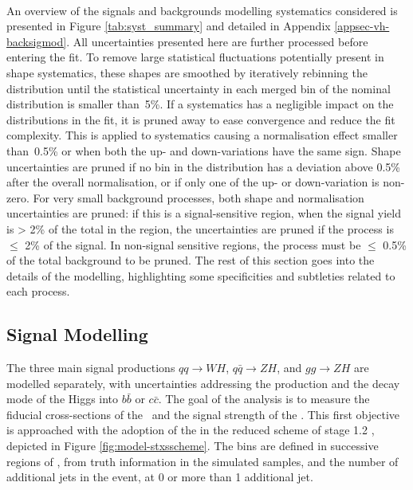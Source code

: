 \paragraph{}An overview of the signals and backgrounds modelling systematics considered is presented in Figure \ref{tab:syst_summary} and detailed in Appendix \ref{appsec-vh-backsigmod}. All uncertainties presented here are further processed before entering the fit. To remove large statistical fluctuations potentially present in shape systematics, these shapes are smoothed by iteratively rebinning the distribution until the statistical uncertainty in each merged bin of the nominal distribution is smaller than~5\%. If a systematics has a negligible impact on the distributions in the fit, it is pruned away to ease convergence and reduce the fit complexity. This is applied to systematics causing a normalisation effect smaller than~0.5\% or when both the up- and down-variations have the same sign. Shape uncertainties are pruned if no bin in the distribution has a deviation above 0.5\% after the overall normalisation, or if only one of the up- or down-variation is non-zero. For very small background processes, both shape and normalisation uncertainties are pruned: if this is a signal-sensitive region, when the signal yield is > 2\% of the total in the region, the uncertainties are pruned if the process is $\leq$ 2\% of the signal. In non-signal sensitive regions, the process must be $\leq$ 0.5\% of the total background to be pruned. The rest of this section goes into the details of the modelling, highlighting some specificities and subtleties related to each process. 

\subsection{Signal Modelling}\label{sec-modSignal}
The three main signal productions $qq \rightarrow WH$, $q\bar{q} \rightarrow ZH$, and $gg \rightarrow ZH$ are modelled separately, with uncertainties addressing the production and the decay mode of the Higgs into $b\bar{b}$ or $c\bar{c}$. The goal of the analysis is to measure the fiducial cross-sections of the \vhb\ and the signal strength of the \vhc. This first objective is approached with the adoption of the  in the reduced scheme of stage 1.2 \cite{badger2016les, berger2019simplified}, depicted in Figure \ref{fig:model-stxsscheme}. The bins are defined in successive regions of \ptv, from truth information in the simulated samples, and the number of additional jets in the event, at 0 or more than 1 additional jet.
  
